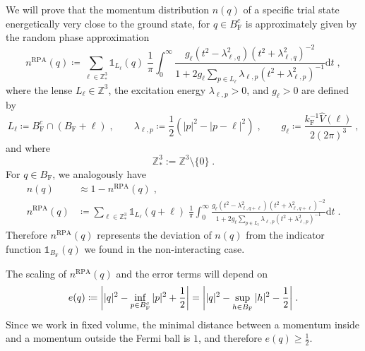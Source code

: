\documentclass[12pt,a4paper]{article}
\numberwithin{equation}{section}
\newcommand{\1}{\mathbb{I}}
\newcommand{\F}{\mathrm{F}}
\newcommand{\RPA}{\mathrm{RPA}}
\newcommand{\Z}{\mathbb{Z}}
\newcommand{\half}{\frac{1}{2}}
\theoremstyle{plain}
\theoremstyle{definition}
\theoremstyle{remark}
\theoremstyle{plain}
\theoremstyle{definition}
\theoremstyle{remark}
\begin{document}
We will prove that the momentum distribution $ n(q) $ of a specific trial state energetically very close to the ground state, for $ q \in B_{\F}^c $ is approximately given by the random phase approximation
\begin{equation} \label{eq:nqb}
	n^{\RPA}(q)
	\coloneq \sum_{\ell \in \Z^3_*}\mathds{1}_{L_{\ell}}(q) \; \frac{1}{\pi}\int_0^\infty \frac{g_\ell (t^2-\lambda^2_{\ell,q}) (t^2 + \lambda^2_{\ell,q})^{-2}}{1 + 2g_\ell \sum_{p \in L_{\ell}}\lambda_{\ell,p} (t^2+\lambda^2_{\ell,p})^{-1}} \mathrm{d}t \;,
\end{equation}
where the lense $ L_\ell \in \Z^3 $, the excitation energy $ \lambda_{\ell,p} > 0 $, and $ g_\ell > 0 $ are defined by
\begin{equation} \label{eq:Lell}
	L_\ell \coloneq B_{\F}^c \cap (B_{\F} + \ell) \;, \qquad
	\lambda_{\ell,p} \coloneq \half (|p|^2 - |p-\ell|^2) \;, \qquad
	g_\ell \coloneq \frac{k_{\F}^{-1} \hat{V}(\ell) }{2 (2 \pi)^3} \;,
\end{equation}
and where \todo{Do we need $\Z^3_*$? Anyway $L_0 = \emptyset$.}
\begin{equation}
\Z^3_* := \Z^3 \setminus \{0\} \;.
\end{equation}
For $ q \in B_{\F} $, we analogously have
\begin{equation}\label{eq:inside}
\begin{split}
	n(q) & \approx 1 - n^{\RPA}(q) \;, \\
	n^{\RPA}(q) & 	\coloneq \sum_{\ell \in \Z^3_*}\mathds{1}_{L_{\ell}}(q+\ell) \; \frac{1}{\pi}\int_0^\infty \frac{g_\ell (t^2-\lambda^2_{\ell,q+\ell}) (t^2 + \lambda^2_{\ell,q+\ell})^{-2}}{1 + 2g_\ell \sum_{p \in L_{\ell}}\lambda_{\ell,p} (t^2+\lambda^2_{\ell,p})^{-1}} \mathrm{d}t \;.
\end{split}
\end{equation}
Therefore $ n^{\RPA}(q) $ represents the deviation of $ n(q) $ from the indicator function $ \mathds{1}_{B_{\F}}(q) $ we found in the non-interacting case.

The scaling of $ n^{\RPA}(q) $ and the error terms will depend on
\begin{equation} \label{eq:eq}
	e(q)
	\coloneq \abs{|q|^2 - \inf_{p \in B_{\F}^c} |p|^2 + \half}
	= \abs{|q|^2 - \sup_{h \in B_{\F}} |h|^2 - \half} \;.
\end{equation}
Since we work in fixed volume, the minimal distance between a momentum inside and a momentum outside the Fermi ball is $1$, and therefore $ e(q) \ge \half $.
\end{document}
